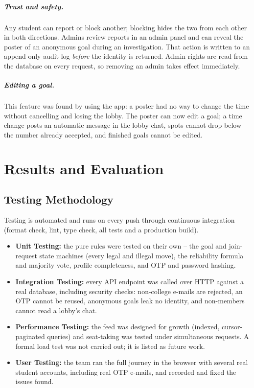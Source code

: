 \documentclass[twoside,12pt]{tietreport}
\begin{document}
\paragraph{Trust and safety.} Any student can report or block another; blocking
hides the two from each other in both directions. Admins review reports in an
admin panel and can reveal the poster of an anonymous goal during an
investigation. That action is written to an append-only audit log \emph{before}
the identity is returned. Admin rights are read from the database on every
request, so removing an admin takes effect immediately.

\paragraph{Editing a goal.} This feature was found by using the app: a poster had
no way to change the time without cancelling and losing the lobby. The poster can
now edit a goal; a time change posts an automatic message in the lobby chat,
spots cannot drop below the number already accepted, and finished goals cannot be
edited.

\chapter{Results and Evaluation}

\section{Testing Methodology}

Testing is automated and runs on every push through continuous integration
(format check, lint, type check, all tests and a production build).

\begin{itemize}
  \item \textbf{Unit Testing:} the pure rules were tested on their own -- the goal
    and join-request state machines (every legal and illegal move), the
    reliability formula and majority vote, profile completeness, and OTP and
    password hashing.
  \item \textbf{Integration Testing:} every API endpoint was called over HTTP
    against a real database, including security checks: non-college e-mails are
    rejected, an OTP cannot be reused, anonymous goals leak no identity, and
    non-members cannot read a lobby's chat.
  \item \textbf{Performance Testing:} the feed was designed for growth (indexed,
    cursor-paginated queries) and seat-taking was tested under simultaneous
    requests. A formal load test was not carried out; it is listed as future work.
  \item \textbf{User Testing:} the team ran the full journey in the browser with
    several real student accounts, including real OTP e-mails, and recorded and
    fixed the issues found.
\end{itemize}
\end{document}
